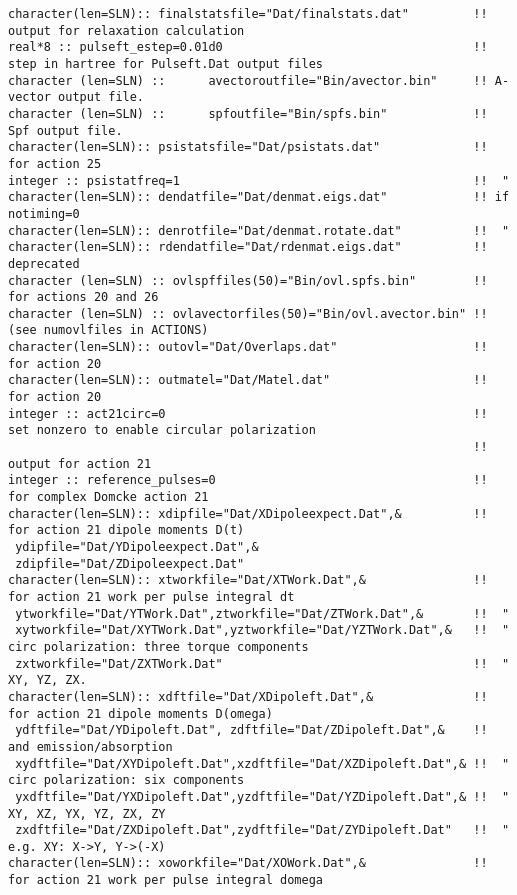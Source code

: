 \begin{verbatim}
character(len=SLN):: finalstatsfile="Dat/finalstats.dat"         !! output for relaxation calculation
real*8 :: pulseft_estep=0.01d0                                   !! step in hartree for Pulseft.Dat output files
character (len=SLN) ::      avectoroutfile="Bin/avector.bin"     !! A-vector output file.        
character (len=SLN) ::      spfoutfile="Bin/spfs.bin"            !! Spf output file.
character(len=SLN):: psistatsfile="Dat/psistats.dat"             !! for action 25
integer :: psistatfreq=1                                         !!  "
character(len=SLN):: dendatfile="Dat/denmat.eigs.dat"            !! if notiming=0
character(len=SLN):: denrotfile="Dat/denmat.rotate.dat"          !!  "
character(len=SLN):: rdendatfile="Dat/rdenmat.eigs.dat"          !! deprecated
character (len=SLN) :: ovlspffiles(50)="Bin/ovl.spfs.bin"        !! for actions 20 and 26 
character (len=SLN) :: ovlavectorfiles(50)="Bin/ovl.avector.bin" !!      (see numovlfiles in ACTIONS)
character(len=SLN):: outovl="Dat/Overlaps.dat"                   !! for action 20
character(len=SLN):: outmatel="Dat/Matel.dat"                    !! for action 20
integer :: act21circ=0                                           !! set nonzero to enable circular polarization 
                                                                 !!     output for action 21
integer :: reference_pulses=0                                    !! for complex Domcke action 21
character(len=SLN):: xdipfile="Dat/XDipoleexpect.Dat",&          !! for action 21 dipole moments D(t)
 ydipfile="Dat/YDipoleexpect.Dat",&
 zdipfile="Dat/ZDipoleexpect.Dat"                 
character(len=SLN):: xtworkfile="Dat/XTWork.Dat",&               !! for action 21 work per pulse integral dt
 ytworkfile="Dat/YTWork.Dat",ztworkfile="Dat/ZTWork.Dat",&       !!  "
 xytworkfile="Dat/XYTWork.Dat",yztworkfile="Dat/YZTWork.Dat",&   !!  "  circ polarization: three torque components
 zxtworkfile="Dat/ZXTWork.Dat"                                   !!  "  XY, YZ, ZX.
character(len=SLN):: xdftfile="Dat/XDipoleft.Dat",&              !! for action 21 dipole moments D(omega)
 ydftfile="Dat/YDipoleft.Dat", zdftfile="Dat/ZDipoleft.Dat",&    !! and emission/absorption
 xydftfile="Dat/XYDipoleft.Dat",xzdftfile="Dat/XZDipoleft.Dat",& !!  "  circ polarization: six components
 yxdftfile="Dat/YXDipoleft.Dat",yzdftfile="Dat/YZDipoleft.Dat",& !!  "  XY, XZ, YX, YZ, ZX, ZY
 zxdftfile="Dat/ZXDipoleft.Dat",zydftfile="Dat/ZYDipoleft.Dat"   !!  "  e.g. XY: X->Y, Y->(-X)
character(len=SLN):: xoworkfile="Dat/XOWork.Dat",&               !! for action 21 work per pulse integral domega

\end{verbatim}
